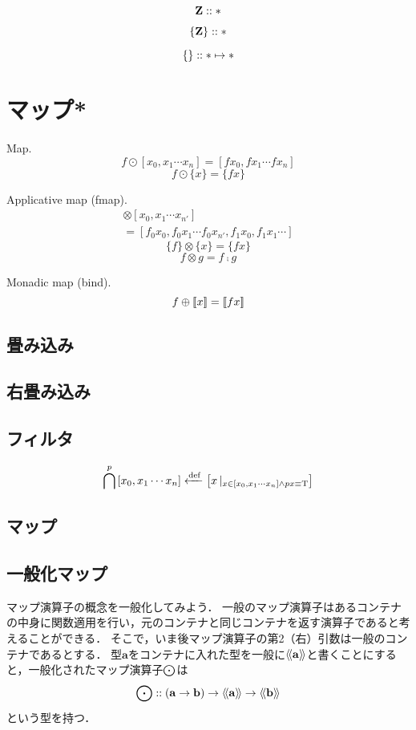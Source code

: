 \documentclass[twocolumn]{jsbook}
\newcommand{\typename}[1]{\mathbf{#1}}
\newcommand{\listtype}[1]{\left[#1\right]}
\newcommand{\guard}[1]{\mathop{\mid_{#1}}}
\begin{document}
$$\integertype::\concretetype$$

$$\maybe{\integertype}::\concretetype$$

$$\left\{{}\right\}::\mathbf\ast\mapsto\mathbf\ast$$

\chapter{マップ*}

Map.
$$f\odot[x_0,x_1\dotsb x_n]=[fx_0,fx_1\dotsb fx_n]$$
$$f\odot\{x\}=\{fx\}$$

Applicative map (fmap).
\begin{multline*}
[f_0,f_1\dotsb f_n]\otimes[x_0,x_1\dotsb x_{n'}]\\
=[f_0x_0,f_0x_1\dotsb f_0x_{n'},f_1x_0,f_1x_1\dotsb]
\end{multline*}
$$\{f\}\otimes\{x\}=\{fx\}$$
$$f\otimes g=f\comp g$$

Monadic map (bind).
$$f\oplus\left[\!\left[x\right]\!\right]=\left[\!\left[fx\right]\!\right]$$


\section{畳み込み}


\section{右畳み込み}


\section{フィルタ}

$$\filterfunc^p\listtype{x_0,x_1\dotsb x_n}\defeq\listtype{x\guard{x\in\listtype{x_0,x_1\dotsb x_n}\wedge px\equiv\truevalue}}$$

\section{マップ}



\section{一般化マップ}

マップ演算子の概念を一般化してみよう．
一般のマップ演算子はあるコンテナの中身に関数適用を行い，元のコンテナと同じコンテナを返す演算子であると考えることができる．
そこで，いま後マップ演算子の第2（右）引数は一般のコンテナであるとする．
型$\typename{a}$をコンテナに入れた型を一般に$\generalcontainer{\typename{a}}$と書くことにすると，一般化されたマップ演算子$\bigodot$は$$\mapfunc::(\typename{a}\rightarrow\typename{b})\rightarrow\generalcontainer{\typename{a}}\rightarrow\generalcontainer{\typename{b}}$$という型を持つ．
\end{document}
